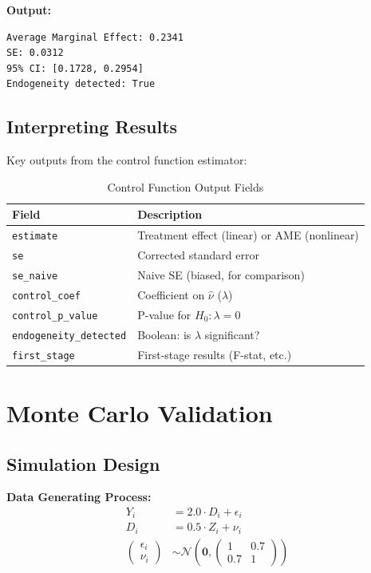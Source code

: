 \textbf{Output:}
\begin{verbatim}
Average Marginal Effect: 0.2341
SE: 0.0312
95% CI: [0.1728, 0.2954]
Endogeneity detected: True
\end{verbatim}

\subsection{Interpreting Results}

Key outputs from the control function estimator:

\begin{table}[htbp]
\centering
\caption{Control Function Output Fields}
\label{tab:cf_outputs}
\begin{tabular}{ll}
\toprule
Field & Description \\
\midrule
\texttt{estimate} & Treatment effect (linear) or AME (nonlinear) \\
\texttt{se} & Corrected standard error \\
\texttt{se\_naive} & Naive SE (biased, for comparison) \\
\texttt{control\_coef} & Coefficient on $\hat{\nu}$ ($\lambda$) \\
\texttt{control\_p\_value} & P-value for $H_0: \lambda = 0$ \\
\texttt{endogeneity\_detected} & Boolean: is $\lambda$ significant? \\
\texttt{first\_stage} & First-stage results (F-stat, etc.) \\
\bottomrule
\end{tabular}
\end{table}


\section{Monte Carlo Validation}
\label{sec:cf_validation}

\subsection{Simulation Design}

\textbf{Data Generating Process:}
\begin{align*}
Y_i &= 2.0 \cdot D_i + \epsilon_i \\
D_i &= 0.5 \cdot Z_i + \nu_i \\
\begin{pmatrix} \epsilon_i \\ \nu_i \end{pmatrix} &\sim \mathcal{N}\left(\mathbf{0}, \begin{pmatrix} 1 & 0.7 \\ 0.7 & 1 \end{pmatrix}\right)
\end{align*}

